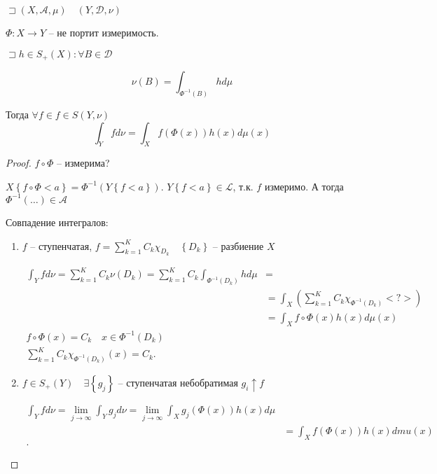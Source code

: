 \begin{theorem}

    $\sqsupset \left( X, \mathscr A, \mu \right) \quad \left( Y, \mathscr{D}, \nu \right) $

    $\Phi: X \to Y$ -- не портит измеримость.

    $\sqsupset h\in S_+(X): \forall B\in \mathscr D$

    \[\nu(B) = \int_{\Phi^{-1}(B)}hd\mu\]

    Тогда $\forall f\in f\in S\left( Y, \nu \right)$
    \[\int_Y fd\nu = \int_X f\left( \Phi(x) \right) h(x) d\mu(x) \]
\end{theorem}
\begin{proof}
    $f\circ \Phi$ -- измерима?

    $X \left\{ f\circ \Phi < a \right\}  = \Phi^{-1}\left( Y\left\{ f<a \right\}  \right) $. $Y\left\{ f<a \right\} \in \mathscr L$, т.к. $f$ измеримо. А тогда  $\Phi^{-1}\left( \ldots \right) \in\mathscr A$ 

    Совпадение интегралов:
    \begin{enumerate}
        \item $f$ -- ступенчатая,  $f = \sum_{k=1}^{K} C_k\chi_{D_k}\quad \left\{ D_k \right\} $ -- разбиение $X$

             \begin{align*}
                 \int_Y fd\nu = \sum_{k=1}^{K} C_k \nu\left( D_k \right)  = \sum_{k=1}^{K} C_k\int_{\Phi^{-1}\left( D_k \right)} h d\mu &=  \\
                 &= \int_X \left( \sum_{k=1}^{K} C_k\chi_{\Phi^{-1}\left( D_k \right)} <?>  \right)  \\
                 &= \int_X f\circ \Phi(x)h(x)d\mu(x) \\
                 f\circ \Phi(x) = C_k\quad x\in \Phi^{-1}(D_k)\\
                 \sum_{k=1}^{K} C_k\chi_{\Phi^{-1}(D_k)}(x) = C_k
             .\end{align*}
         \item $f\in S_+(Y)\quad \exists \left\{ g_{j} \right\} $ -- ступенчатая небобратимая $g_i\uparrow f$

              \begin{align*}
                  \int_Y fd\nu = \lim_{j \to \infty} \int_Yg_jd\nu = \lim_{j \to \infty} \int_X g_j\left( \Phi(x) \right) h(x)d\mu\\
                  &= \int_X f\left( \Phi(x) \right) h(x)dmu(x) \\
             .\end{align*}


\end{enumerate}
\end{proof}
